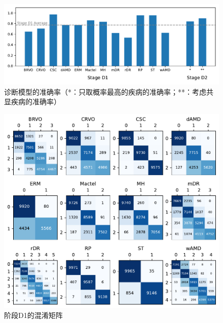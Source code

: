 \documentclass{article}
\begin{document}
	\begin{figure}[htbp]
		\centering
		\includegraphics[width=\linewidth]{Figs/diagnosis1_acc_barchart.pdf}
		\caption{诊断模型的准确率（*：只取概率最高的疾病的准确率；**：考虑共显疾病的准确率）}
		\vspace{0.3cm}
		\label{fig:D1_acc_bar}
	\end{figure}
	
	\begin{figure}[htbp]
		\centering
		\includegraphics[width=\linewidth]{Figs/diagnosis1_confusion_matrix.pdf}
		\caption{阶段D1的混淆矩阵}
		\vspace{0.3cm}
		\label{fig:D1_conf_mat}
	\end{figure}
	
\end{document}
